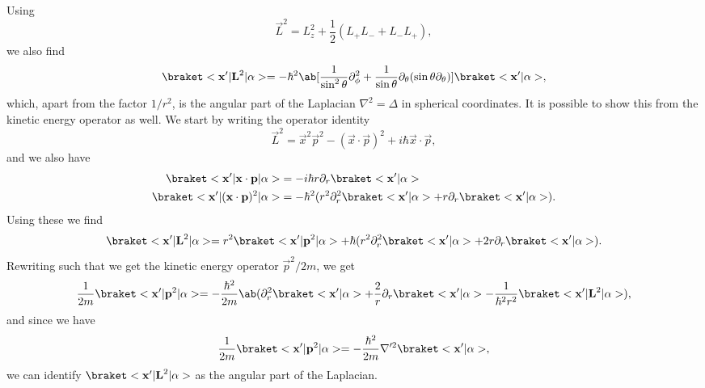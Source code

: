 Using 
\begin{equation}
    \vec{L}^2 = L_z^2 + \frac{1}{2} (L_+ L_- + L_- L_+),
\end{equation}
we also find
\begin{equation}
    \bkop{\vec{x}'}{\vec{L}^2}{\alpha} = -\hbar^2 \ab [ \frac{1}{\sin^2\theta} \partial_\phi^2 + \frac{1}{\sin\theta} \partial_\theta (\sin\theta \partial_\theta) ]\bk{\vec{x}'}{\alpha},
\end{equation}
which, apart from the factor $1/r^2$, is the angular part of the Laplacian $\nabla^2 = \Delta$ in spherical coordinates. It is possible to show this from the kinetic energy operator as well. We start by writing the operator identity
\begin{equation}
    \vec{L}^2 = \vec{x}^2 \vec{p}^2 - (\vec{x}\cdot\vec{p})^2 + i\hbar \vec{x}\cdot\vec{p},
\end{equation}
and we also have 
\begin{align}
    \bkop{\vec{x}'}{\vec{x}\cdot\vec{p}}{\alpha} &= -i\hbar r \partial_r \bk{\vec{x}'}{\alpha}\\
    \bkop{\vec{x}'}{(\vec{x}\cdot\vec{p})^2}{\alpha} &= -\hbar^2 (r^2 \partial_r^2 \bk{\vec{x}'}{\alpha} + r \partial_r \bk{\vec{x}'}{\alpha}).
\end{align}
Using these we find
\begin{equation}
    \bkop{\vec{x}'}{\vec{L}^2}{\alpha} = r^2 \bkop{\vec{x}'}{\vec{p}^2}{\alpha} + \hbar (r^2 \partial_r^2 \bk{\vec{x}'}{\alpha} + 2r \partial_r \bk{\vec{x}'}{\alpha}).
\end{equation}
Rewriting such that we get the kinetic energy operator $\vec{p}^2 /2m$, we get
\begin{equation}
    \frac{1}{2m} \bkop{\vec{x}'}{\vec{p}^2}{\alpha} = - \frac{\hbar^2}{2m} \ab(\partial_r^2\bk{\vec{x}'}{\alpha} + \frac{2}{r}\partial_r \bk{\vec{x}'}{\alpha}- \frac{1}{\hbar^2r^2} \bkop{\vec{x}'}{\vec{L}^2}{\alpha}),
\end{equation}
and since we have 
\begin{equation}
    \frac{1}{2m} \bkop{\vec{x}'}{\vec{p}^2}{\alpha} = -\frac{\hbar^2}{2m} \nabla'^2 \bk{\vec{x}'}{\alpha},
\end{equation}
we can identify $\bkop{\vec{x}'}{\vec{L}^2}{\alpha}$ as the angular part of the Laplacian.

